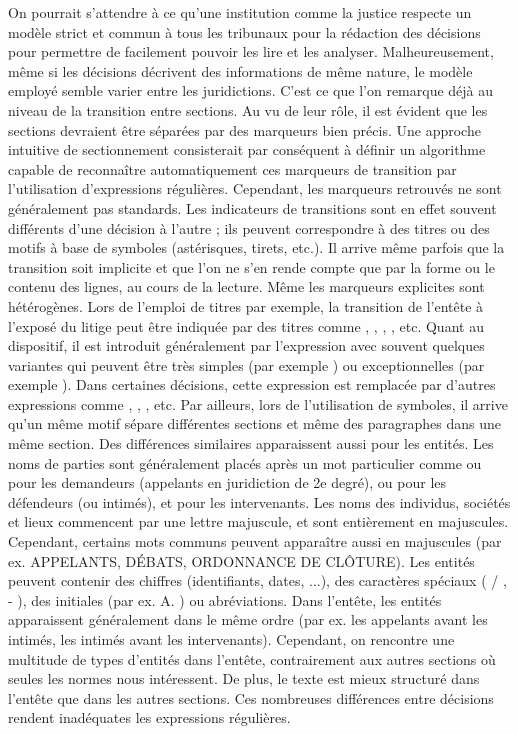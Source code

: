 On pourrait s'attendre à ce qu'une institution comme la justice respecte un modèle strict et commun à tous les tribunaux pour la rédaction des décisions pour permettre de facilement pouvoir les lire et les analyser. Malheureusement, même si les  décisions décrivent des informations de même nature, le modèle employé semble varier entre les juridictions. C'est ce que l'on remarque déjà au niveau de la transition entre sections. Au vu de leur rôle, il est évident que les sections devraient être séparées par des marqueurs bien précis. Une approche intuitive de sectionnement consisterait par conséquent à définir un algorithme capable de reconnaître automatiquement ces marqueurs de transition par l'utilisation d'expressions régulières. Cependant, les marqueurs retrouvés ne sont généralement pas standards. Les indicateurs de transitions sont en effet souvent différents d'une décision à l'autre ; ils peuvent correspondre à des titres ou des motifs à base de symboles (astérisques, tirets, etc.). Il arrive même parfois que la transition soit implicite et que l'on ne s'en rende compte que par la forme ou le contenu des lignes, au cours de la lecture. Même les marqueurs explicites sont hétérogènes. Lors de l'emploi de titres par exemple, la transition de l'entête à l'exposé du litige peut être indiquée par des titres comme  \fg{},  \fg{},  \fg{},  \fg{}, etc. Quant au dispositif, il est introduit généralement par l'expression  \fg{} avec souvent quelques variantes qui peuvent être très simples (par exemple  \fg{}) ou exceptionnelles (par exemple  \fg{}). Dans certaines décisions, cette expression est remplacée par d'autres expressions comme  \fg{},  \fg{},  \fg{}, etc. 
Par ailleurs, lors de l'utilisation de symboles, il arrive qu'un même motif sépare différentes sections et même des paragraphes dans une même section. Des différences similaires apparaissent aussi pour les entités. Les noms de parties sont généralement placés après un mot particulier comme   \fg{} ou  \fg{} pour les demandeurs (appelants en juridiction de 2e degré),  \fg{} ou  \fg{} pour les défendeurs (ou intimés), et   \fg{} pour les intervenants. Les noms des individus, sociétés et lieux commencent par une lettre majuscule, et sont entièrement en majuscules. Cependant, certains mots communs peuvent apparaître aussi en majuscules (par ex. {APPELANTS}, {DÉBATS}, {ORDONNANCE DE CLÔTURE}). Les entités peuvent contenir des chiffres (identifiants, dates, ...), des caractères spéciaux ( \og / \fg{},  \og - \fg{}), des initiales (par ex. \og A. \fg) ou abréviations.  Dans l'entête, les entités apparaissent généralement dans le même ordre (par ex. les appelants avant les intimés, les intimés avant les intervenants). Cependant, on rencontre une multitude de types d'entités dans l'entête, contrairement aux autres sections où seules les normes nous intéressent. De plus, le texte est mieux structuré dans l'entête que dans les autres sections. Ces nombreuses différences entre décisions rendent inadéquates les expressions régulières.

